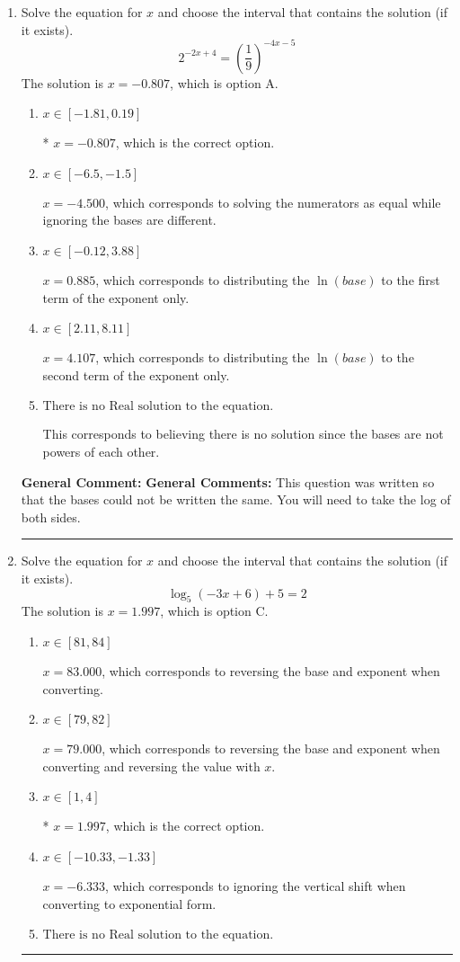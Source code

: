 \documentclass{extbook}[14pt]
\newcommand{\litem}[1]{\item #1

\rule{\textwidth}{0.4pt}}
\begin{document}
\begin{enumerate}\litem{
Solve the equation for $x$ and choose the interval that contains the solution (if it exists).
\[ 2^{-2x+4} = \left(\frac{1}{9}\right)^{-4x-5} \]The solution is \( x = -0.807 \), which is option A.\begin{enumerate}[label=\Alph*.]
\item \( x \in [-1.81, 0.19] \)

* $x = -0.807$, which is the correct option.
\item \( x \in [-6.5, -1.5] \)

$x = -4.500$, which corresponds to solving the numerators as equal while ignoring the bases are different.
\item \( x \in [-0.12, 3.88] \)

$x = 0.885$, which corresponds to distributing the $\ln(base)$ to the first term of the exponent only.
\item \( x \in [2.11, 8.11] \)

$x = 4.107$, which corresponds to distributing the $\ln(base)$ to the second term of the exponent only.
\item \( \text{There is no Real solution to the equation.} \)

This corresponds to believing there is no solution since the bases are not powers of each other.
\end{enumerate}

\textbf{General Comment:} \textbf{General Comments:} This question was written so that the bases could not be written the same. You will need to take the log of both sides.
}
\litem{
Solve the equation for $x$ and choose the interval that contains the solution (if it exists).
\[ \log_{5}{(-3x+6)}+5 = 2 \]The solution is \( x = 1.997 \), which is option C.\begin{enumerate}[label=\Alph*.]
\item \( x \in [81, 84] \)

$x = 83.000$, which corresponds to reversing the base and exponent when converting.
\item \( x \in [79, 82] \)

$x = 79.000$, which corresponds to reversing the base and exponent when converting and reversing the value with $x$.
\item \( x \in [1, 4] \)

* $x = 1.997$, which is the correct option.
\item \( x \in [-10.33, -1.33] \)

$x = -6.333$, which corresponds to ignoring the vertical shift when converting to exponential form.
\item \( \text{There is no Real solution to the equation.} \)


\end{enumerate}}
\end{enumerate}
\end{document}
